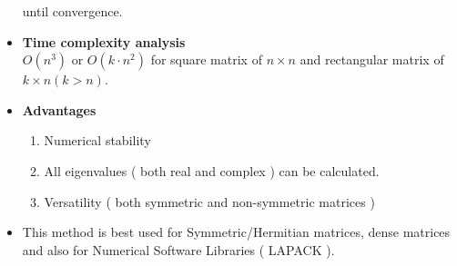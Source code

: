 \documentclass[article]{IEEEtran}
\numberwithin{equation}{enumi}
\numberwithin{figure}{enumi}
\begin{document}
\begin{itemize}
					until convergence.
			\item \textbf{Time complexity analysis} \\
				$O(n^3)$ or $O(k \cdot n^2)$ for square matrix of $n \times n$ and rectangular matrix of $k \times n ( k > n )$.
			\item \textbf{Advantages} \\
				\begin{enumerate}
					\item Numerical stability
					\item All eigenvalues ( both real and complex ) can be calculated.
					\item Versatility ( both symmetric and non-symmetric matrices )
				\end{enumerate}
			\item This method is best used for Symmetric/Hermitian matrices, dense matrices and also for Numerical Software Libraries ( LAPACK ).
				
			\end{itemize}
\end{document}
